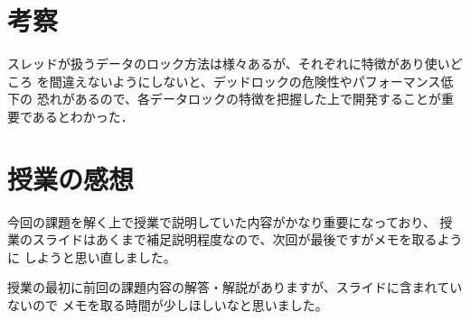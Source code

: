 \documentclass[10pt]{jarticle}
\begin{document}
\newpage

\section{考察}
スレッドが扱うデータのロック方法は様々あるが、それぞれに特徴があり使いどころ
を間違えないようにしないと、デッドロックの危険性やパフォーマンス低下の
恐れがあるので、各データロックの特徴を把握した上で開発することが重要であるとわかった．

\section{授業の感想}
今回の課題を解く上で授業で説明していた内容がかなり重要になっており、
授業のスライドはあくまで補足説明程度なので、次回が最後ですがメモを取るように
しようと思い直しました。

授業の最初に前回の課題内容の解答・解説がありますが、スライドに含まれていないので
メモを取る時間が少しほしいなと思いました。
\end{document}
